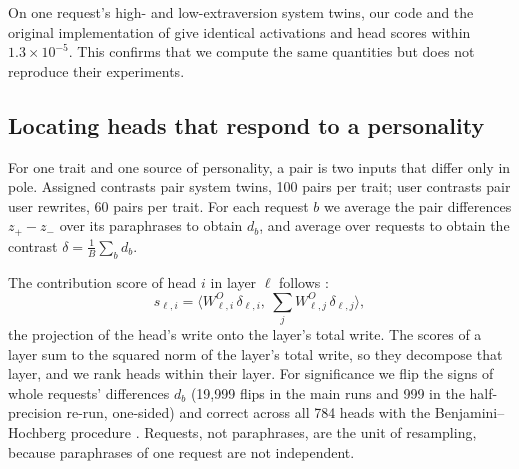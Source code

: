 On one request's high- and low-extraversion system twins, our code and the original implementation of \citet{izawa2026steering} give identical activations and head scores within $1.3 \times 10^{-5}$. This confirms that we compute the same quantities but does not reproduce their experiments.

\subsection{Locating heads that respond to a personality}
\label{sec:localize}
For one trait and one source of personality, a pair is two inputs that differ only in pole. Assigned contrasts pair system twins, 100 pairs per trait; user contrasts pair user rewrites, 60 pairs per trait. For each request $b$ we average the pair differences $z_+ - z_-$ over its paraphrases to obtain $d_b$, and average over requests to obtain the contrast $\delta = \frac{1}{B}\sum_b d_b$.

The contribution score of head $i$ in layer $\ell$ follows \citet{izawa2026steering}:
\begin{equation}
s_{\ell,i} = \Big\langle W^O_{\ell,i}\,\delta_{\ell,i},\ \sum_{j} W^O_{\ell,j}\,\delta_{\ell,j} \Big\rangle ,
\end{equation}
the projection of the head's write onto the layer's total write. The scores of a layer sum to the squared norm of the layer's total write, so they decompose that layer, and we rank heads within their layer. For significance we flip the signs of whole requests' differences $d_b$ (19,999 flips in the main runs and 999 in the half-precision re-run, one-sided) and correct across all 784 heads with the Benjamini--Hochberg procedure \citep{benjamini1995controlling}. Requests, not paraphrases, are the unit of resampling, because paraphrases of one request are not independent.

